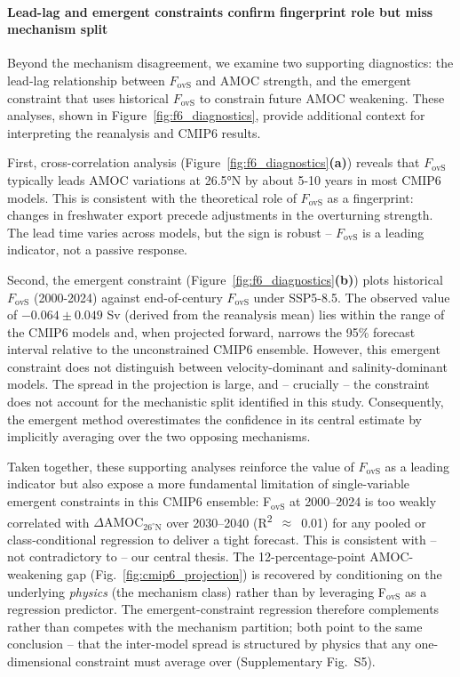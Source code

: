 \documentclass[11pt,a4paper]{article}
\begin{document}
\paragraph*{Lead-lag and emergent constraints confirm fingerprint role but miss mechanism split}

Beyond the mechanism disagreement, we examine two supporting diagnostics: the lead-lag relationship between \(F_{\mathrm{ovS}}\) and AMOC strength, and the emergent constraint that uses historical \(F_{\mathrm{ovS}}\) to constrain future AMOC weakening. These analyses, shown in Figure~\ref{fig:f6_diagnostics}, provide additional context for interpreting the reanalysis and CMIP6 results.

First, cross-correlation analysis (Figure~\ref{fig:f6_diagnostics}\textbf{(a)}) reveals that \(F_{\mathrm{ovS}}\) typically leads AMOC variations at 26.5°N by about 5-10 years in most CMIP6 models. This is consistent with the theoretical role of \(F_{\mathrm{ovS}}\) as a fingerprint: changes in freshwater export precede adjustments in the overturning strength. The lead time varies across models, but the sign is robust -- \(F_{\mathrm{ovS}}\) is a leading indicator, not a passive response.

Second, the emergent constraint (Figure~\ref{fig:f6_diagnostics}\textbf{(b)}) plots historical \(F_{\mathrm{ovS}}\) (2000-2024) against end-of-century \(F_{\mathrm{ovS}}\) under SSP5-8.5. The observed value of \(-0.064 \pm 0.049\) Sv (derived from the reanalysis mean) lies within the range of the CMIP6 models and, when projected forward, narrows the 95\% forecast interval relative to the unconstrained CMIP6 ensemble. However, this emergent constraint does not distinguish between velocity-dominant and salinity-dominant models. The spread in the projection is large, and -- crucially -- the constraint does not account for the mechanistic split identified in this study. Consequently, the emergent method overestimates the confidence in its central estimate by implicitly averaging over the two opposing mechanisms.

Taken together, these supporting analyses reinforce the value of \(F_{\mathrm{ovS}}\) as a leading indicator but also expose a more fundamental limitation of single-variable emergent constraints in this CMIP6 ensemble: F$_{\mathrm{ovS}}$ at 2000--2024 is too weakly correlated with $\Delta\mathrm{AMOC}_{26^\circ\mathrm{N}}$ over 2030--2040 (R\textsuperscript{2}~$\approx$~0.01) for any pooled or class-conditional regression to deliver a tight forecast. This is consistent with -- not contradictory to -- our central thesis. The 12-percentage-point AMOC-weakening gap (Fig.~\ref{fig:cmip6_projection}) is recovered by conditioning on the underlying \emph{physics} (the mechanism class) rather than by leveraging F$_{\mathrm{ovS}}$ as a regression predictor. The emergent-constraint regression therefore complements rather than competes with the mechanism partition; both point to the same conclusion -- that the inter-model spread is structured by physics that any one-dimensional constraint must average over (Supplementary Fig.~S5).
\end{document}
